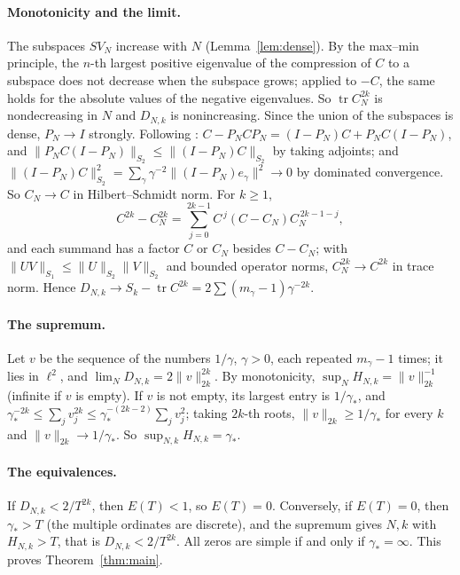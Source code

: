 \documentclass[11pt,a4paper]{article}
\theoremstyle{plain}
\theoremstyle{remark}
\DeclareMathOperator{\tr}{tr}
\begin{document}
\paragraph{Monotonicity and the limit.}
The subspaces $SV_N$ increase with $N$ (Lemma~\ref{lem:dense}). By the max--min principle, the $n$-th largest
positive eigenvalue of the compression of $C$ to a subspace does not decrease when the subspace grows; applied to $-C$,
the same holds for the absolute values of the negative eigenvalues. So $\tr C_N^{2k}$ is nondecreasing in $N$ and
$D_{N,k}$ is nonincreasing. Since the union of the subspaces is dense, $P_N\to I$ strongly. Following
\cite[(4.1)]{suzuki}: $C-P_NCP_N=(I-P_N)C+P_NC(I-P_N)$, and $\|P_NC(I-P_N)\|_{S_2}\le\|(I-P_N)C\|_{S_2}$ by taking
adjoints; and $\|(I-P_N)C\|_{S_2}^2=\sum_\gamma\gamma^{-2}\|(I-P_N)e_\gamma\|^2\to0$ by dominated convergence. So
$C_N\to C$ in Hilbert--Schmidt norm. For $k\ge1$,
\[
 C^{2k}-C_N^{2k}=\sum_{j=0}^{2k-1}C^{\,j}(C-C_N)C_N^{\,2k-1-j},
\]
and each summand has a factor $C$ or $C_N$ besides $C-C_N$; with $\|UV\|_{S_1}\le\|U\|_{S_2}\|V\|_{S_2}$ and bounded
operator norms, $C_N^{2k}\to C^{2k}$ in trace norm. Hence $D_{N,k}\to S_k-\tr C^{2k}=2\sum(m_\gamma-1)\gamma^{-2k}$.

\paragraph{The supremum.}
Let $v$ be the sequence of the numbers $1/\gamma$, $\gamma>0$, each repeated $m_\gamma-1$ times; it lies in
$\ell^2$, and $\lim_ND_{N,k}=2\|v\|_{2k}^{2k}$. By monotonicity, $\sup_NH_{N,k}=\|v\|_{2k}^{-1}$ (infinite if $v$ is
empty). If $v$ is not empty, its largest entry is $1/\gamma_*$, and
$\gamma_*^{-2k}\le\sum_jv_j^{2k}\le\gamma_*^{-(2k-2)}\sum_jv_j^2$; taking $2k$-th roots, $\|v\|_{2k}\ge1/\gamma_*$ for
every $k$ and $\|v\|_{2k}\to1/\gamma_*$. So $\sup_{N,k}H_{N,k}=\gamma_*$.

\paragraph{The equivalences.}
If $D_{N,k}<2/T^{2k}$, then $E(T)<1$, so $E(T)=0$. Conversely, if $E(T)=0$, then $\gamma_*>T$ (the multiple
ordinates are discrete), and the supremum gives $N,k$ with $H_{N,k}>T$, that is $D_{N,k}<2/T^{2k}$. All zeros are
simple if and only if $\gamma_*=\infty$. This proves Theorem~\ref{thm:main}.
\end{document}
